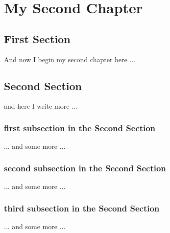 \chapter{My Second Chapter}
\ifpdf
    \graphicspath{{Chapter2/Chapter2Figs/PNG/}{Chapter2/Chapter2Figs/PDF/}{Chapter2/Chapter2Figs/}}
\else
    \graphicspath{{Chapter2/Chapter2Figs/EPS/}{Chapter2/Chapter2Figs/}}
\fi



\section{First Section}

And now I begin my second chapter here ...

\section{Second Section}

and here I write more ...

\subsection{first subsection in the Second Section}
... and some more ...

\subsection{second subsection in the Second Section}
... and some more ...

\subsection{third subsection in the Second Section}
... and some more ...


